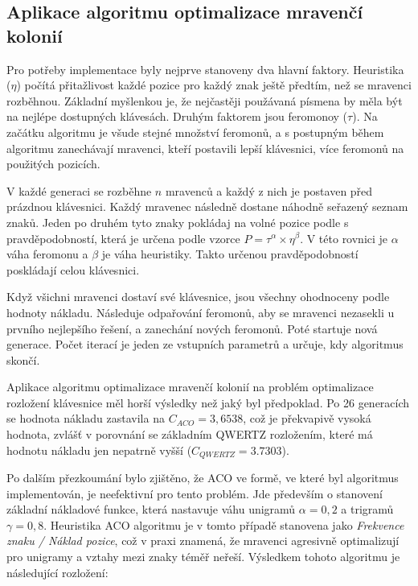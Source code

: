 \documentclass[a4paper, twoside, 12pt, czech]{article}
\begin{document}
\subsection{Aplikace algoritmu optimalizace mravenčí kolonií}

Pro potřeby implementace byly nejprve stanoveny dva hlavní faktory. Heuristika ($\eta$)
počítá přitažlivost každé pozice pro každý znak ještě předtím, než se mravenci 
rozběhnou. Základní myšlenkou je, že nejčastěji použávaná písmena by měla být 
na nejlépe dostupných klávesách. Druhým faktorem jsou feromonoy ($\tau$). Na začátku 
algoritmu je všude stejné množství feromonů, a s postupným během algoritmu zanechávají 
mravenci, kteří postavili lepší klávesnici, více feromonů na použitých pozicích.

V každé generaci se rozběhne $n$ mravenců a každý z nich je postaven před prázdnou 
klávesnici. Každý mravenec následně dostane náhodně seřazený sez\-nam znaků. Jeden 
po druhém tyto znaky pokládaj na volné pozice podle s pravděpodob\-ností, 
která je určena podle vzorce $P = \tau^\alpha \times \eta^\beta$. V této rovnici 
je $\alpha$ váha feromonu a $\beta$ je váha heuristiky. Takto určenou pravděpodobností 
poskládají celou klávesnici.

Když všichni mravenci dostaví své klávesnice, jsou všechny ohodnoceny pod\-le hodnoty 
nákladu. Následuje odpařování feromonů, aby se mravenci nezasekli u prvního nejlepšího 
řešení, a zanechání nových feromonů. Poté startuje nová generace. Počet iterací 
je jeden ze vstupních parametrů a určuje, kdy algoritmus skončí.

Aplikace algoritmu optimalizace mravenčí kolonií na problém optimalizace rozložení
klávesnice měl horší výsledky než jaký byl předpoklad. Po 26 generacích se hodnota 
nákladu zastavila na $C_{ACO} = 3,6538$, což je překvapivě vysoká hodnota, zvlášť 
v porovnání se základním QWERTZ rozložením, které má hodnotu nákladu jen nepatrně 
vyšší ($C_{QWERTZ} = 3.7303$).

Po dalším přezkoumání bylo zjištěno, že ACO ve formě, ve které byl algoritmus 
implementován, je neefektivní pro tento problém. Jde především o stanovení základní 
nákladové funkce, která nastavuje váhu unigramů $\alpha = 0,2$ a trigramů 
$\gamma = 0,8$. Heuristika ACO algoritmu je v tomto případě stanovena jako 
\textit{Frekvence znaku / Náklad pozice}, což v praxi znamená, že mravenci agresivně 
optimalizují pro unigramy a vztahy mezi znaky téměř neřeší. Výsledkem tohoto 
algoritmu je následující rozložení:
\end{document}
